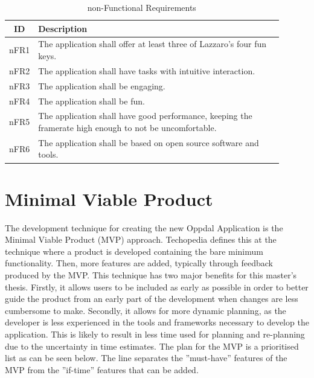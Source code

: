     \FloatBarrier
    \begin{table}
    \label{tab:nfr}
    \caption{non-Functional Requirements}
    \begin{tabular}{ | c | p{0.9\linewidth} | }
        \hline
        \textbf{ID} & \textbf{Description} \\
        \hline
        nFR1 & The application shall offer at least three of Lazzaro's four fun keys. \\
        nFR2 & The application shall have tasks with intuitive interaction. \\
        nFR3 & The application shall be engaging. \\
        nFR4 & The application shall be fun. \\
        nFR5 & The application shall have good performance, keeping the framerate high enough to not be uncomfortable. \\
        nFR6 & The application shall be based on open source software and tools. \\
        \hline
    \end{tabular}
    \end{table}
    \FloatBarrier

\section{Minimal Viable Product}
    The development technique for creating the new Oppdal Application is the Minimal Viable Product (MVP) approach. Techopedia\cite{techopedia} defines this at the technique where a product is developed containing the bare minimum functionality. Then, more features are added, typically through feedback produced by the MVP. This technique has two major benefits for this master's thesis. Firstly, it allows users to be included as early as possible in order to better guide the product from an early part of the development when changes are less cumbersome to make. Secondly, it allows for more dynamic planning, as the developer is less experienced in the tools and frameworks necessary to develop the application. This is likely to result in less time used for planning and re-planning due to the uncertainty in time estimates. The plan for the MVP is a prioritised list as can be seen below. The line separates the ''must-have'' features of the MVP from the ''if-time'' features that can be added.
    
